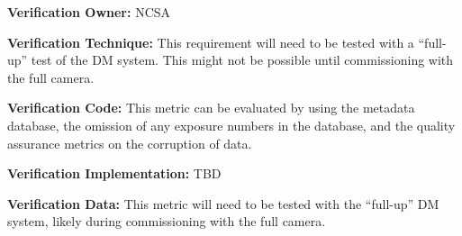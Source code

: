 \documentclass[DM,lsstdraft,toc]{lsstdoc}
\begin{document}
\textbf{Verification Owner:} NCSA

\textbf{Verification Technique:} This requirement will need to be tested
with a ``full-up'' test of the DM system. This might not be possible
until commissioning with the full camera.

\textbf{Verification Code:} This metric can be evaluated by using the
metadata database, the omission of any exposure numbers in the database,
and the quality assurance metrics on the corruption of data.

\textbf{Verification Implementation:} TBD

\textbf{Verification Data:} This metric will need to be tested with the
``full-up'' DM system, likely during commissioning with the full camera.
\end{document}
